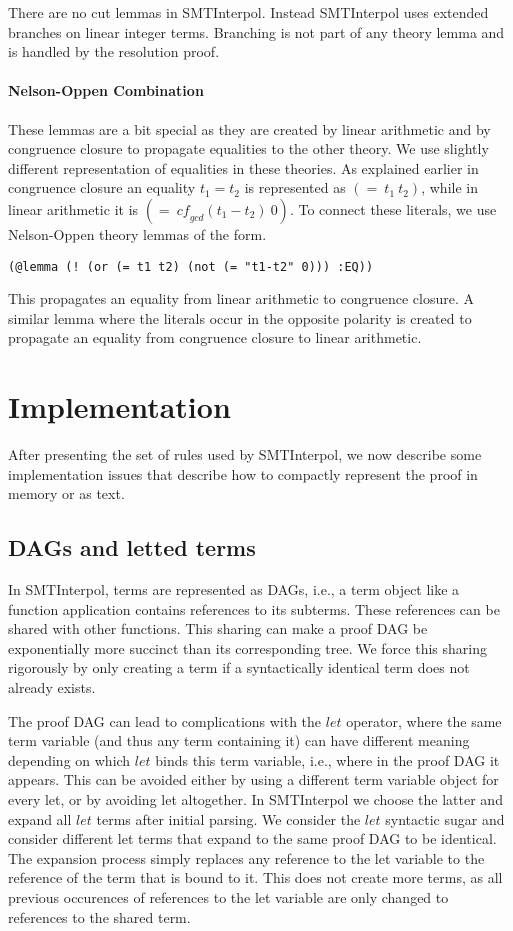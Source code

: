 \documentclass[a4paper]{article}
\newcommand\si{SMTInterpol\xspace}
\newcommand\cf{\mathit{cf}}
\begin{document}
There are no cut lemmas in \si.  Instead \si uses extended branches on
linear integer terms.  Branching is not part of any theory lemma and
is handled by the resolution proof.

\paragraph{Nelson-Oppen Combination}

These lemmas are a bit special as they are created by linear
arithmetic and by congruence closure to propagate equalities to the
other theory.  We use slightly different representation of equalities
in these theories.  As explained earlier in congruence closure an
equality $t_1=t_2$ is represented as $(=\ t_1\ t_2)$,
while in linear arithmetic it is $(=\ \cf_{gcd}(t_1-t_2)\ 0)$.
To connect these literals, we use Nelson-Oppen theory lemmas of the form.
\begin{verbatim}
(@lemma (! (or (= t1 t2) (not (= "t1-t2" 0))) :EQ))
\end{verbatim}
This propagates an equality from linear arithmetic to congruence
closure.  A similar lemma where the literals occur in the opposite
polarity is created to propagate an equality from congruence closure
to linear arithmetic.

\section{Implementation}
After presenting the set of rules used by \si, we now describe some
implementation issues that describe how to compactly represent the
proof in memory or as text.

\subsection{DAGs and letted terms}
In \si, terms are represented as DAGs, i.e., a term object like a
function application contains references to its subterms.  These
references can be shared with other functions.  This sharing can make
a proof DAG be exponentially more succinct than its corresponding
tree.  We force this sharing rigorously by only creating a term if a
syntactically identical term does not already exists.

The proof DAG can lead to complications with the $let$ operator, where
the same term variable (and thus any term containing it) can have
different meaning depending on which $let$ binds this term variable,
i.e., where in the proof DAG it appears.  This can be avoided either
by using a different term variable object for every let, or by
avoiding let altogether.  In \si we choose the latter and expand all
$let$ terms after initial parsing.  We consider the $let$ syntactic
sugar and consider different let terms that expand to the same proof
DAG to be identical.  The expansion process simply replaces any
reference to the let variable to the reference of the term that is
bound to it.  This does not create more terms, as all previous
occurences of references to the let variable are only changed to
references to the shared term.
\end{document}
